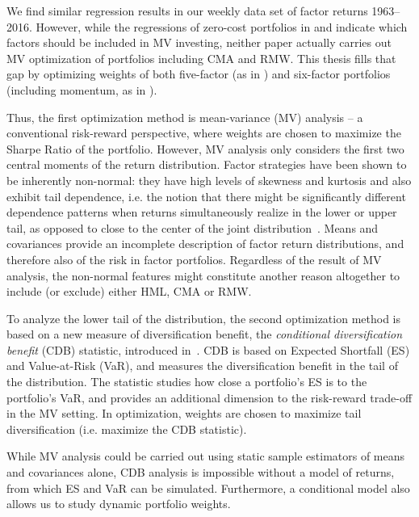 We find similar regression results in our weekly data set of factor returns 1963--2016. However, while the regressions of zero-cost portfolios in \textcite{FF2015} and \textcite{Asness2015} indicate which factors should be included in MV investing, neither paper actually carries out MV optimization of portfolios including CMA and RMW. This thesis fills that gap by optimizing weights of both five-factor (as in \textcite{FF2015}) and six-factor portfolios (including momentum, as in \textcite{Asness2015}). 

Thus, the first optimization method is mean-variance (MV) analysis -- a conventional risk-reward perspective, where weights are chosen to maximize the Sharpe Ratio of the portfolio. However, MV analysis only considers the first two central moments of the return distribution. Factor strategies have been shown to be inherently non-normal: they have high levels of skewness and kurtosis and also exhibit tail dependence, i.e. the notion that there might be significantly different dependence patterns when returns simultaneously realize in the lower or upper tail, as opposed to close to the center of the joint distribution~\autocite{ChristoffersenLanglois2013}. Means and covariances provide an incomplete description of factor return distributions, and therefore also of the risk in factor portfolios. Regardless of the result of MV analysis, the non-normal features might constitute another reason altogether to include (or exclude) either HML, CMA or RMW.

To analyze the lower tail of the distribution, the second optimization method is based on a new measure of diversification benefit, the \emph{conditional diversification benefit} (CDB) statistic, introduced in~\textcite{ChristoffersenErrunzaJacobLanglois2012}. CDB is based on Expected Shortfall (ES) and Value-at-Risk (VaR), and measures the diversification benefit in the tail of the distribution. The statistic studies how close a portfolio's ES is to the portfolio's VaR, and provides an additional dimension to the risk-reward trade-off in the MV setting. In optimization, weights are chosen to maximize tail diversification (i.e. maximize the CDB statistic).

While MV analysis could be carried out using static sample estimators of means and covariances alone, CDB analysis is impossible without a model of returns, from which ES and VaR can be simulated. Furthermore, a conditional model also allows us to study dynamic portfolio weights. 

